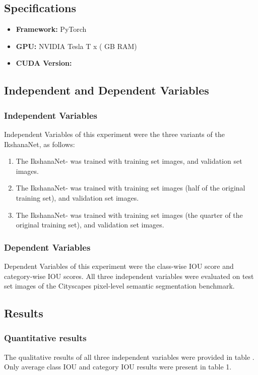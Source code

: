 \documentclass{article}
\begin{document}
\subsection{Specifications}
\begin{itemize}
    \item \textbf{Framework:} PyTorch 
    \item \textbf{GPU:} NVIDIA Tesla T x  ( GB RAM)
    \item \textbf{CUDA Version:} 
\end{itemize}
\subsection{Independent and Dependent Variables}
\subsubsection{Independent Variables} Independent Variables of this experiment were the three variants of the IkshanaNet, as follows:
\begin{enumerate}
    \item The IkshanaNet- was trained with  training set images, and  validation set images.
    \item The IkshanaNet- was trained with  training set images (half of the original training set), and  validation set images.
    \item The IkshanaNet- was trained with  training set images (the quarter of the original training set), and  validation set images.
\end{enumerate}
\subsubsection{Dependent Variables} Dependent Variables of this experiment were the class-wise IOU score and category-wise IOU scores. All three independent variables were evaluated on  test set images of the Cityscapes pixel-level semantic segmentation benchmark.
\subsection{Results}
\subsubsection{Quantitative results}
The qualitative results of all three independent variables were provided in table . Only average class IOU and category IOU results were present in table 1. 
\end{document}

